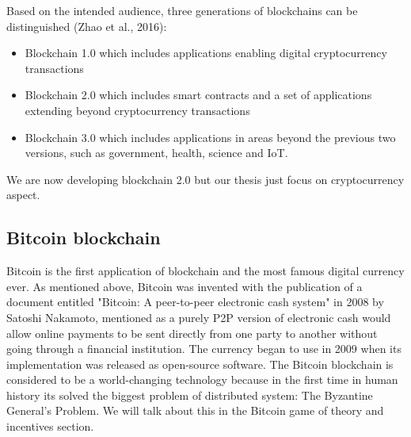 

Based on the intended audience, three generations of blockchains can be distinguished (Zhao et al., 2016):
\begin{itemize}

\item Blockchain 1.0 which includes applications enabling digital cryptocurrency transactions
\item Blockchain 2.0 which includes smart contracts and a set of applications extending beyond cryptocurrency transactions
\item Blockchain 3.0 which includes applications in areas beyond the previous two versions, such as government, health, science and IoT.

\end{itemize}

We are now developing blockchain 2.0 but our thesis just focus on cryptocurrency aspect.


\subsection{Bitcoin blockchain}
Bitcoin is the first application of blockchain and the most famous digital currency ever.
As mentioned above, Bitcoin was invented with the publication of a document entitled "Bitcoin: A peer-to-peer electronic cash system" in 2008 by Satoshi Nakamoto, mentioned as a purely P2P version of electronic cash would allow online payments to be sent directly from one party to another without going through a financial institution. 
The currency began to use in 2009 when its implementation was released as open-source software. 
The Bitcoin blockchain is considered to be a world-changing technology because in the first time in human history its solved the biggest problem of distributed system: The Byzantine General's Problem. 
We will talk about this in the Bitcoin game of theory and incentives section.


